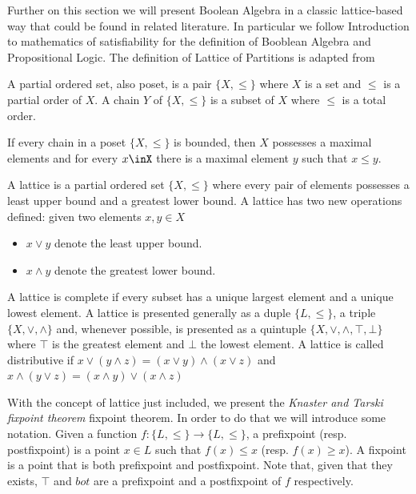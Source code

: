 Further on this section we will present Boolean Algebra in a classic lattice-based way that could be found in related literature. In particular we follow Introduction to mathematics of satisfiability\cite{marek2009introduction} for the definition of Booblean Algebra and Propositional Logic. The definition of Lattice of Partitions is adapted from \cite{sakallah2009symmetry}

\begin{definition}
  A partial ordered set, also poset, is a pair $\{X, \le\}$ where $X$ is a set and $\le$ is a partial order of $X$. A chain $Y$ of $\{X, \le\}$ is a subset of $X$ where $\le$ is a total order. 
\end{definition}

\begin{proposition}
  If every chain in a poset $\{X,\le\}$ is bounded, then $X$ possesses a maximal elements and for every $x\inX$ there is a maximal element $y$ such that $x\le y$.
\end{proposition}



\begin{definition} A lattice is a partial ordered set $\{X,\le\}$ where every pair of elements possesses a least upper bound and a greatest lower bound. A lattice has two new operations defined: given two elements $x,y\in X$
  \begin{itemize}
  \item $x\vee y$ denote the least upper bound.
  \item $x\wedge y$  denote the greatest lower bound.
  \end{itemize}
\end{definition}


  A lattice is complete if every subset has a unique largest element and a unique lowest element. A lattice is presented generally as a duple $\{L,\le\}$, a triple $\{X,\vee,\wedge\}$ and, whenever possible, is presented as a quintuple $\{X, \vee, \wedge, \top,\bot\}$ where $\top$ is the greatest element and $\bot$ the lowest element. A lattice is called distributive if $x\vee(y \wedge z) = (x\vee y) \wedge (x \vee z)$ and $x\wedge(y \vee z) = (x\wedge y) \vee (x \wedge z)$



With the concept of lattice just included, we present the \emph{Knaster and Tarski fixpoint theorem} fixpoint theorem. In order to do that we will introduce some notation. Given a function $f:\{L,\le\}\to \{L,\le\}$, a prefixpoint (resp. postfixpoint) is a point $x \in L$ such that $f(x) \le x$ (resp. $f(x) \ge x$). A fixpoint is a point that is both prefixpoint and postfixpoint. Note that, given that they exists, $\top$ and $bot$ are a prefixpoint and a postfixpoint of $f$ respectively.

